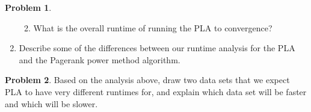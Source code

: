 \documentclass[10pt]{article}
\theoremstyle{definition}
\newtheorem{problem}{Problem}
\begin{document}
\begin{problem}
\begin{enumerate}
\begin{enumerate}
                    \vspace{5in}
                \item
            What is the overall runtime of running the PLA to convergence?
            \end{enumerate}

            \newpage
        \item
            Describe some of the differences between our runtime analysis for the PLA and the Pagerank power method algorithm.

        \end{enumerate}
\end{problem}
\newpage
\begin{problem}
    Based on the analysis above, draw two data sets that we expect PLA to have very different runtimes for, and explain which data set will be faster and which will be slower.
\end{problem}
\end{document}
